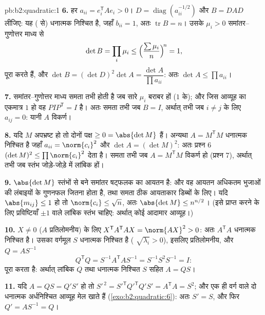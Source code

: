 \begin{solution}{pb:b2:quadratic:1}
\textbf{6.} हर $a_{ii} = e_i^{\mathsf T}Ae_i > 0$। $D =
\operatorname{diag}(a_{ii}^{-1/2})$ और $B = DAD$ लीजिए: यह ( से) धनात्मक निश्चित
है, जहाँ $b_{ii} = 1$, अतः $\operatorname{tr}
B = n$। उसके  $\mu_i > 0$ समांतर--गुणोत्तर माध्य से
\[
\det B = \prod_i\mu_i
\leq \Bigl(\frac{\sum\mu_i}{n}\Bigr)^{\!n} = 1 ,
\]
पूरा करते हैं, और $\det B = (\det D)^2\det A = \dfrac{\det A}{\prod
a_{ii}}$: अतः $\det A \leq \prod a_{ii}$।

\textbf{7.} समांतर--गुणोत्तर माध्य समता तभी होती है जब सारे $\mu_i$ बराबर हों
($1$ के); और जिस  आव्यूह का एकमात्र  $1$ हो वह $PIP^{\mathsf T} = I$ है।
अतः समता तभी जब $B = I$, अर्थात् तभी जब $i \neq j$ के लिए $a_{ij} = 0$: यानी $A$ विकर्ण।

\textbf{8.} यदि $M$ अपभ्रष्ट हो तो दोनों पक्ष $\geq 0 =
\abs{\det M}$ हैं। अन्यथा $A = M^{\mathsf T}M$ धनात्मक
निश्चित है जहाँ $a_{ii} = \norm{c_i}^2$ और $\det A = (\det
M)^2$: अतः प्रश्न 6 $(\det M)^2 \leq \prod\norm{c_i}^2$ देता है। समता तभी जब $A = M^{\mathsf T}M$
विकर्ण हो (प्रश्न 7), अर्थात् तभी जब स्तंभ जोड़े-जोड़े में लांबिक हों।

\textbf{9.} $\abs{\det M}$ स्तंभों से बने समांतर षट्फलक का आयतन है: और वह आयतन
अधिकतम भुजाओं की लंबाइयों के गुणनफल जितना होता है, तथा समता ठीक आयताकार
डिब्बों के लिए। यदि $\abs{m_{ij}} \leq 1$ हो तो $\norm{c_i} \leq \sqrt n$, अतः $\abs{\det M} \leq n^{n/2}$। (इसे प्राप्त करने के लिए
प्रविष्टियाँ $\pm1$ वाले लांबिक स्तंभ चाहिए: अर्थात् कोई आदामार आव्यूह।)

\textbf{10.} $X \neq 0$ ($A$ प्रतिलोमनीय) के लिए $X^{\mathsf T}A^{\mathsf T}AX = \norm{AX}^2 > 0$: अतः $A^{\mathsf T}A$ धनात्मक निश्चित
है। उसका वर्गमूल $S$ धनात्मक निश्चित है ( $\sqrt{\lambda_i} > 0$), इसलिए
प्रतिलोमनीय, और $Q = AS^{-1}$
\[
Q^{\mathsf T}Q = S^{-1}A^{\mathsf T}AS^{-1}
= S^{-1}S^2S^{-1} = I :
\]
पूरा करता है: अर्थात् लांबिक $Q$ तथा धनात्मक निश्चित $S$ सहित $A = QS$।

\textbf{11.} यदि $A = QS = Q'S'$ हो तो $S'^{\,2} =
S'^{\mathsf T}Q'^{\mathsf T}Q'S' = A^{\mathsf T}A = S^2$; और एक ही वर्ग वाले दो धनात्मक अर्धनिश्चित
आव्यूह मेल खाते हैं (\cref{exo:b2:quadratic:6}): अतः $S' = S$, और फिर $Q' = AS^{-1} =
Q$।


\end{solution}
